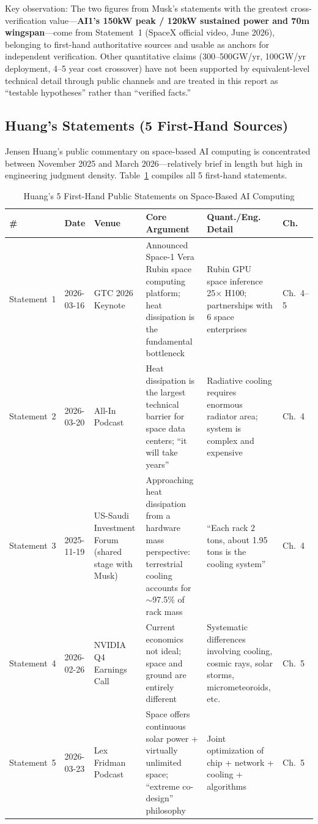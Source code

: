 Key observation: The two figures from Musk's statements with the greatest cross-verification value---\textbf{AI1's 150\;kW peak / 120\;kW sustained power and 70\;m wingspan}---come from Statement~1 (SpaceX official video, June 2026), belonging to first-hand authoritative sources and usable as anchors for independent verification\cite{spacex2026ai1}. Other quantitative claims (300--500\;GW/yr, 100\;GW/yr deployment, 4--5 year cost crossover) have not been supported by equivalent-level technical detail through public channels and are treated in this report as ``testable hypotheses'' rather than ``verified facts.''

\subsection{Huang's Statements (5 First-Hand Sources)}

Jensen Huang's public commentary on space-based AI computing is concentrated between November 2025 and March 2026---relatively brief in length but high in engineering judgment density. Table~\ref{tab:huang_statements} compiles all 5 first-hand statements.

\begin{table}[H]
\centering
\caption{Huang's 5 First-Hand Public Statements on Space-Based AI Computing}
\label{tab:huang_statements}
\footnotesize
\begin{tabular}{p{1.45cm}p{1.75cm}p{1.35cm}p{3.25cm}p{2.65cm}p{1.1cm}}
\toprule
\textbf{\#} & \textbf{Date} & \textbf{Venue} & \textbf{Core Argument} & \textbf{Quant./Eng. Detail} & \textbf{Ch.} \\
\midrule
Statement~1 & 2026-03-16 & GTC 2026 Keynote & Announced Space-1 Vera Rubin space computing platform; heat dissipation is the fundamental bottleneck & Rubin GPU space inference 25$\times$ H100; partnerships with 6 space enterprises & Ch.~4--5 \\
\hline
Statement~2 & 2026-03-20 & All-In Podcast & Heat dissipation is the largest technical barrier for space data centers; ``it will take years'' & Radiative cooling requires enormous radiator area; system is complex and expensive & Ch.~4 \\
\hline
Statement~3 & 2025-11-19 & US-Saudi Investment Forum (shared stage with Musk) & Approaching heat dissipation from a hardware mass perspective: terrestrial cooling accounts for $\sim$97.5\% of rack mass & ``Each rack 2 tons, about 1.95 tons is the cooling system'' & Ch.~4 \\
\hline
Statement~4 & 2026-02-26 & NVIDIA Q4 Earnings Call & Current economics not ideal; space and ground are entirely different & Systematic differences involving cooling, cosmic rays, solar storms, micrometeoroids, etc. & Ch.~5 \\
\hline
Statement~5 & 2026-03-23 & Lex Fridman Podcast & Space offers continuous solar power + virtually unlimited space; ``extreme co-design'' philosophy & Joint optimization of chip + network + cooling + algorithms & Ch.~5 \\
\bottomrule
\end{tabular}
\end{table}

